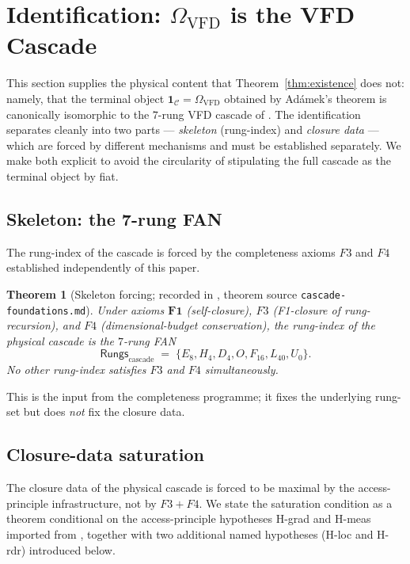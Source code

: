 \documentclass[11pt, a4paper]{amsart}
\newtheorem{theorem}{Theorem}[section]
\theoremstyle{definition}
\newcommand{\Rungs}{\mathsf{Rungs}}
\newcommand{\catC}{\mathcal{C}}
\newcommand{\Omegacap}{\Omega_{\mathrm{VFD}}}
\begin{document}
\section{Identification: $\Omegacap$ is the VFD Cascade}
\label{sec:identification}

This section supplies the physical content that
Theorem~\ref{thm:existence} does not: namely, that the terminal
object $\mathbf{1}_\catC = \Omegacap$ obtained by Ad\'amek's
theorem is canonically isomorphic to the $7$-rung VFD cascade
of \cite{CascadeCompletenessAudit}. The identification separates
cleanly into two parts — \emph{skeleton} (rung-index) and
\emph{closure data} — which are forced by different mechanisms
and must be established separately. We make both explicit to
avoid the circularity of stipulating the full cascade as the
terminal object by fiat.

\subsection{Skeleton: the 7-rung FAN}

The rung-index of the cascade is forced by the completeness
axioms $F3$ and $F4$ established independently of this paper.

\begin{theorem}[Skeleton forcing; recorded in
  \cite{CascadeCompletenessAudit}, theorem source
  \texttt{cascade-foundations.md}]
\label{thm:skeleton-forcing}
Under axioms $\mathbf{F1}$ (self-closure), $F3$ (F1-closure of
rung-recursion), and $F4$ (dimensional-budget conservation),
the rung-index of the physical cascade is the $7$-rung FAN
\[
    \Rungs_{\mathrm{cascade}} \;=\;
    \{E_8, H_4, D_4, O, F_{16}, L_{40}, U_0\}.
\]
No other rung-index satisfies $F3$ and $F4$ simultaneously.
\end{theorem}

This is the input from the completeness programme; it fixes the
underlying rung-set but does \emph{not} fix the closure data.

\subsection{Closure-data saturation}

The closure data of the physical cascade is forced to be
maximal by the access-principle infrastructure, not by $F3+F4$.
We state the saturation condition as a theorem conditional on
the access-principle hypotheses H-grad and H-meas imported
from \cite{CascadeAccessPrinciple}, together with two additional
named hypotheses (H-loc and H-rdr) introduced below.
\end{document}
